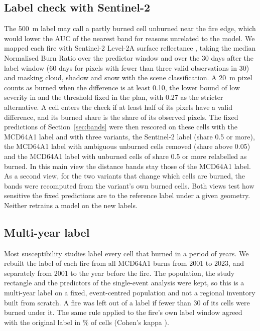 \documentclass[preprint,12pt,authoryear]{elsarticle}
\begin{document}
\subsection{Label check with Sentinel-2}
\label{sec:labels}

The 500~m label may call a partly burned cell unburned near the fire edge, which would lower the AUC of the nearest band for reasons unrelated to the model. We mapped each fire with Sentinel-2 Level-2A surface reflectance \citep{S2SR}, taking the median Normalised Burn Ratio over the predictor window and over the 30 days after the label window (60 days for pixels with fewer than three valid observations in 30) and masking cloud, shadow and snow with the scene classification. A 20~m pixel counts as burned when the difference is at least 0.10, the lower bound of low severity in \citet{KeyBenson2006} and the threshold fixed in the plan, with 0.27 as the stricter alternative. A cell enters the check if at least half of its pixels have a valid difference, and its burned share is the share of its observed pixels. The fixed predictions of Section~\ref{sec:bands} were then rescored on these cells with the MCD64A1 label and with three variants, the Sentinel-2 label (share 0.5 or more), the MCD64A1 label with ambiguous unburned cells removed (share above 0.05) and the MCD64A1 label with unburned cells of share 0.5 or more relabelled as burned. In this main view the distance bands stay those of the MCD64A1 label. As a second view, for the two variants that change which cells are burned, the bands were recomputed from the variant's own burned cells. Both views test how sensitive the fixed predictions are to the reference label under a given geometry. Neither retrains a model on the new labels.

\subsection{Multi-year label}
\label{sec:multiyear}

Most susceptibility studies label every cell that burned in a period of years. We rebuilt the label of each fire from all MCD64A1 burns from 2001 to 2023, and separately from 2001 to the year before the fire. The population, the study rectangle and the predictors of the single-event analysis were kept, so this is a multi-year label on a fixed, event-centred population and not a regional inventory built from scratch. A fire was left out of a label if fewer than 30 of its cells were burned under it. The same rule applied to the fire's own label window agreed with the original label in \vaggAgree\% of cells (Cohen's kappa \vaggKappa).
\end{document}
